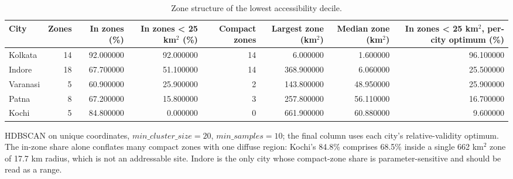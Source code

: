 \begin{table}[htbp]
\centering
\small
\caption{Zone structure of the lowest accessibility decile.}
\label{tab:t16_zones}
\begin{tabular}{lrrrrrrr}
\toprule
City & Zones & In zones (\%) & In zones < 25 km$^2$ (\%) & Compact zones & Largest zone (km$^2$) & Median zone (km$^2$) & In zones < 25 km$^2$, per-city optimum (\%) \\
\midrule
Kolkata & 14 & 92.000000 & 92.000000 & 14 & 6.000000 & 1.600000 & 96.100000 \\
Indore & 18 & 67.700000 & 51.100000 & 14 & 368.900000 & 6.060000 & 25.500000 \\
Varanasi & 5 & 60.900000 & 25.900000 & 2 & 143.800000 & 48.950000 & 25.900000 \\
Patna & 8 & 67.200000 & 15.800000 & 3 & 257.800000 & 56.110000 & 16.700000 \\
Kochi & 5 & 84.800000 & 0.000000 & 0 & 661.900000 & 60.880000 & 9.600000 \\
\bottomrule
\end{tabular}
\begin{tablenotes}\footnotesize
\item HDBSCAN on unique coordinates, $\textit{min\_cluster\_size}=20$, $\textit{min\_samples}=10$; the final column uses each city's relative-validity optimum. The in-zone share alone conflates many compact zones with one diffuse region: Kochi's 84.8\% comprises 68.5\% inside a single 662 km$^2$ zone of 17.7 km radius, which is not an addressable site. Indore is the only city whose compact-zone share is parameter-sensitive and should be read as a range.
\end{tablenotes}
\end{table}

